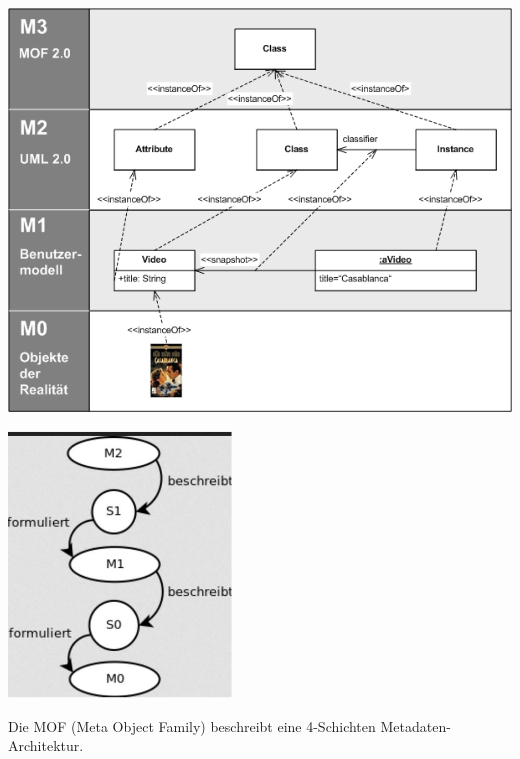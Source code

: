 \documentclass[a4paper, 11pt, nofootinbib]{article}
\begin{document}
\begin{minipage}{0.7\textwidth}
	\includegraphics[keepaspectratio=true, height=15\baselineskip]{mof.png}
	\label{fig:mof}
\end{minipage}
\begin{minipage}{0.3\textwidth}
	\includegraphics[keepaspectratio=true, height=12\baselineskip]{mof2.png}
	\label{fig:mof2}
\end{minipage}

\vspace{10px}


\noindent Die MOF (Meta Object Family) beschreibt eine 4-Schichten Metadaten-Architektur.
\end{document}
